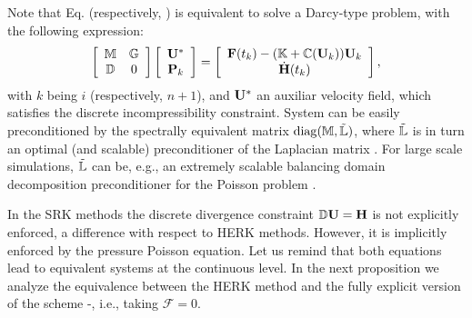{
\begin{remark}
Note that Eq.  (respectively, ) is equivalent to solve a Darcy-type problem, with the following expression:
\begin{equation}
\label{eq-C6_IMEX_up_RK_p_darcy}
\left[\begin{array}{cc}
\mathbb{M}&\mathbb{G}\\
\mathbb{D}&0
\end{array}\right]\left[\begin{array}{c}
{\bf U}^*\\
{\bf P}_k
\end{array}\right]=\left[\begin{array}{c}
{\bf F}(t_k) - (\mathbb{K}+\mathbb{C}({\bf U}_k)){\bf U}_k\\
\dot{\bf{H}}(t_k)
\end{array}\right],
\end{equation}
with $k$ being $i$ (respectively, $n+1$), and ${\bf U}^*$ an auxiliar velocity field, which satisfies the discrete incompressibility constraint. System  can be easily preconditioned by the spectrally equivalent matrix ${\rm diag}(\mathbb{M},\tilde {\mathbb{L}})$, where $\tilde {\mathbb{L}}$ is in turn an optimal (and scalable) preconditioner of the Laplacian matrix \cite{badia_algebraic_2008,elman_finite_2005}. For large scale simulations, $\tilde {\mathbb{L}}$ can be, e.g., an extremely scalable balancing domain decomposition  preconditioner for the Poisson problem \cite{badia_implementation_2013,art003,art008}. \end{remark}}

In the SRK methods the discrete divergence constraint $\mathbb{D}{\bf U} = \bf{H}$ is not explicitly enforced, a difference with respect to HERK methods. However, it is implicitly enforced by the pressure Poisson equation. Let us remind that both equations lead to equivalent systems at the continuous level. In the next proposition we analyze the equivalence between the HERK method and the fully explicit version of the scheme -, i.e., taking $\mathcal{F} = 0$. 

